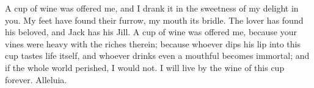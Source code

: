 A cup of wine was offered me, and I drank it in the sweetness of my delight in you. My feet have found their furrow, my mouth its bridle. The lover has found his beloved, and Jack has his Jill. A cup of wine was offered me, because your vines were heavy with the riches therein; because whoever dips his lip into this cup tastes life itself, and whoever drinks even a mouthful becomes immortal; and if the whole world perished, I would not. I will live by the wine of this cup forever. Alleluia.
